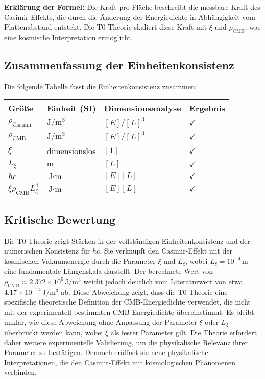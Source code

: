 \documentclass{article}
\begin{document}
	\textbf{Erklärung der Formel:} Die Kraft pro Fläche beschreibt die messbare Kraft des Casimir-Effekts, die durch die Änderung der Energiedichte in Abhängigkeit vom Plattenabstand entsteht. Die T0-Theorie skaliert diese Kraft mit $\xi$ und $\rho_{\text{CMB}}$, was eine kosmische Interpretation ermöglicht.
	
	\subsection{Zusammenfassung der Einheitenkonsistenz}
	Die folgende Tabelle fasst die Einheitenkonsistenz zusammen:
	\begin{table}[h]
		\centering
		\begin{tabular}{l l l l}
			\toprule
			Größe & Einheit (SI) & Dimensionsanalyse & Ergebnis \\
			\midrule
			$\rho_{\text{Casimir}}$ & $\text{J}/\text{m}^3$ & $[E]/[L]^3$ & $\checkmark$ \\
			$\rho_{\text{CMB}}$ & $\text{J}/\text{m}^3$ & $[E]/[L]^3$ & $\checkmark$ \\
			$\xi$ & dimensionslos & $[1]$ & $\checkmark$ \\
			$L_\xi$ & $\text{m}$ & $[L]$ & $\checkmark$ \\
			$\hbar c$ & $\text{J} \cdot \text{m}$ & $[E][L]$ & $\checkmark$ \\
			$\xi \rho_{\text{CMB}} L_\xi^4$ & $\text{J} \cdot \text{m}$ & $[E][L]$ & $\checkmark$ \\
			\bottomrule
		\end{tabular}
	\end{table}
	
	\subsection{Kritische Bewertung}
	Die T0-Theorie zeigt Stärken in der vollständigen Einheitenkonsistenz und der numerischen Konsistenz für $\hbar c$. Sie verknüpft den Casimir-Effekt mit der kosmischen Vakuumenergie durch die Parameter $\xi$ und $L_\xi$, wobei $L_\xi = 10^{-4} \, \text{m}$ eine fundamentale Längenskala darstellt. Der berechnete Wert von $\rho_{\text{CMB}} \approx 2.372 \times 10^6 \, \text{J}/\text{m}^3$ weicht jedoch deutlich vom Literaturwert von etwa $4.17 \times 10^{-14} \, \text{J}/\text{m}^3$ ab. Diese Abweichung zeigt, dass die T0-Theorie eine spezifische theoretische Definition der CMB-Energiedichte verwendet, die nicht mit der experimentell bestimmten CMB-Energiedichte übereinstimmt. Es bleibt unklar, wie diese Abweichung ohne Anpassung der Parameter $\xi$ oder $L_\xi$ überbrückt werden kann, wobei $\xi$ als fester Parameter gilt. Die Theorie erfordert daher weitere experimentelle Validierung, um die physikalische Relevanz ihrer Parameter zu bestätigen. Dennoch eröffnet sie neue physikalische Interpretationen, die den Casimir-Effekt mit kosmologischen Phänomenen verbinden.
	
\end{document}

